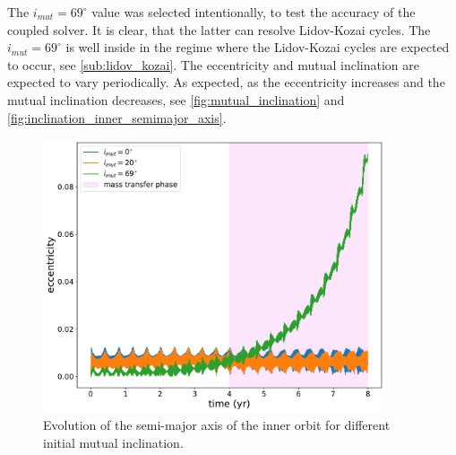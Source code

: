 The $i_{mut}=69^{\circ}$ value was selected intentionally, to test the accuracy of the coupled solver. It is clear, that the latter can resolve Lidov-Kozai cycles. The $i_{mut}=69^{\circ}$ is well inside in the regime where the Lidov-Kozai cycles are expected to occur, see \cref{sub:lidov_kozai}. The eccentricity and mutual inclination are expected to vary periodically. As expected, as the eccentricity increases and the mutual inclination decreases, see \cref{fig:mutual_inclination} and \cref{fig:inclination_inner_semimajor_axis}.
\begin{figure}[!htb]
    \centering
    \includegraphics[width=0.9\textwidth]{Thesis/graphs/inclination_case/inclination_inner_ecc.pdf}
    \caption{Evolution of the semi-major axis of the inner orbit for different initial mutual inclination.}
    \label{fig:inclination_inner_ecc}
\end{figure}